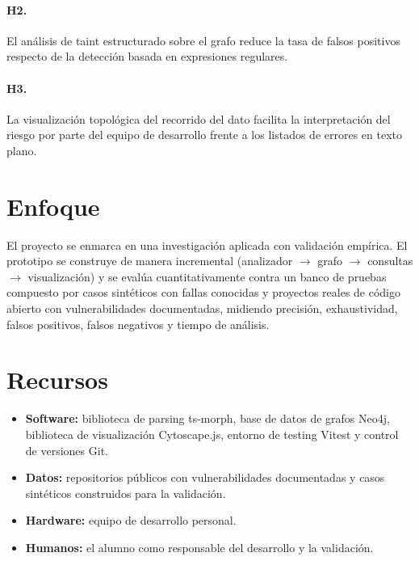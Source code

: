 \paragraph{H2.} El análisis de taint estructurado sobre el grafo reduce la tasa de falsos positivos respecto de la detección basada en expresiones regulares.

\paragraph{H3.} La visualización topológica del recorrido del dato facilita la interpretación del riesgo por parte del equipo de desarrollo frente a los listados de errores en texto plano.

\section{Enfoque}\label{sec:n1.7}

El proyecto se enmarca en una investigación aplicada con validación empírica. El prototipo se construye de manera incremental (analizador $\rightarrow$ grafo $\rightarrow$ consultas $\rightarrow$ visualización) y se evalúa cuantitativamente contra un banco de pruebas compuesto por casos sintéticos con fallas conocidas y proyectos reales de código abierto con vulnerabilidades documentadas, midiendo precisión, exhaustividad, falsos positivos, falsos negativos y tiempo de análisis.

\section{Recursos}\label{sec:n1.8}

\begin{itemize}
    \item \textbf{Software: }biblioteca de parsing ts-morph, base de datos de grafos Neo4j, biblioteca de visualización Cytoscape.js, entorno de testing Vitest y control de versiones Git.
    \item \textbf{Datos: }repositorios públicos con vulnerabilidades documentadas y casos sintéticos construidos para la validación.
    \item \textbf{Hardware: }equipo de desarrollo personal.
    \item \textbf{Humanos: }el alumno como responsable del desarrollo y la validación.
\end{itemize}
